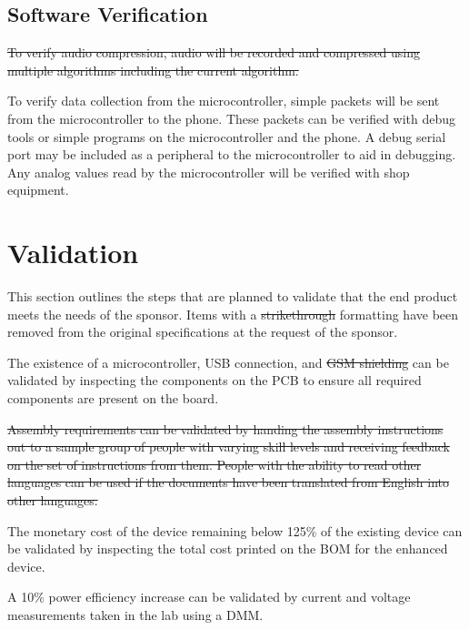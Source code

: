 \documentclass{article}
\numberwithin{figure}{section}
\numberwithin{equation}{section}
\begin{document}
{\subsection{Software Verification} \label{sect:softwareverification}
\sout{To verify audio compression, audio will be recorded and compressed using multiple algorithms including the current algorithm.}

\bigskip
To verify data collection from the microcontroller, simple packets will be sent from the microcontroller to the phone. These packets can be verified with debug tools or simple programs on the microcontroller and the phone. A debug serial port may be included as a peripheral to the microcontroller to aid in debugging. Any analog values read by the microcontroller will be verified with shop equipment.

\newpage

\section{Validation} \label{sect:validation}
This section outlines the steps that are planned to validate that the end product meets the needs of the sponsor. Items with a \sout{strikethrough} formatting have been removed from the original specifications at the request of the sponsor.

\bigskip

The existence of a microcontroller, USB connection, and \sout{GSM shielding} can be validated by inspecting the components on the PCB to ensure all required components are present on the board.

\bigskip

\sout{Assembly requirements can be validated by handing the assembly instructions out to a sample group of people with varying skill levels and receiving feedback on the set of instructions from them. People with the ability to read other languages can be used if the documents have been translated from English into other languages.}

\bigskip

The monetary cost of the device remaining below 125\% of the existing device can be validated by inspecting the total cost printed on the BOM for the enhanced device.

\bigskip

A 10\% power efficiency increase can be validated by current and voltage measurements taken in the lab using a DMM.

\bigskip

}
\end{document}
